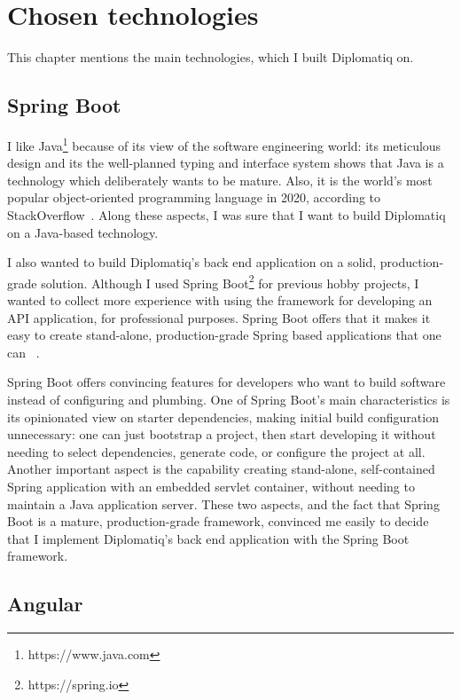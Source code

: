 \chapter{Chosen technologies}
\label{chapter:chosentechnologies}

This chapter mentions the main technologies, which I built Diplomatiq on.

\section{Spring Boot}

I like Java\footnote{https://www.java.com} because of its view of the software engineering world: its meticulous design and its the well-planned typing and interface system shows that Java is a technology which deliberately wants to be mature. Also, it is the world's most popular object-oriented programming language in 2020, according to StackOverflow~\cite{java-popularity}. Along these aspects, I was sure that I want to build Diplomatiq on a Java-based technology.

I also wanted to build Diplomatiq's back end application on a solid, production-grade solution. Although I used Spring Boot\footnote{https://spring.io} for previous hobby projects, I wanted to collect more experience with using the framework for developing an API application, for professional purposes. Spring Boot offers that it makes it easy to create stand-alone, production-grade Spring based applications that one can ~\cite{spring-boot-reference-docs}.

Spring Boot offers convincing features for developers who want to build software instead of configuring and plumbing. One of Spring Boot's main characteristics is its opinionated view on starter dependencies, making initial build configuration unnecessary: one can just bootstrap a project, then start developing it without needing to select dependencies, generate code, or configure the project at all. Another important aspect is the capability creating stand-alone, self-contained Spring application with an embedded servlet container, without needing to maintain a Java application server. These two aspects, and the fact that Spring Boot is a mature, production-grade framework, convinced me easily to decide that I implement Diplomatiq's back end application with the Spring Boot framework.

\section{Angular}

